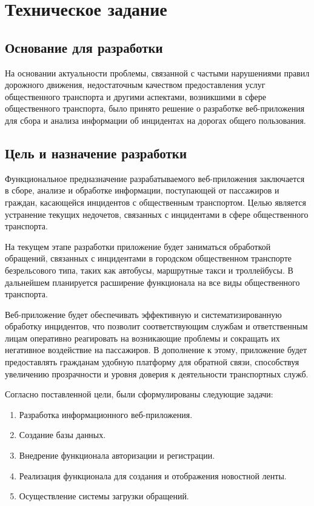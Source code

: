 \section{Техническое задание}
\subsection{Основание для разработки}

На основании актуальности проблемы, связанной с частыми нарушениями правил дорожного движения, недостаточным качеством предоставления услуг общественного транспорта и другими аспектами, возникшими в сфере общественного транспорта, было принято решение о разработке веб-приложения для сбора и анализа информации об инцидентах на дорогах общего пользования.

\subsection{Цель и назначение разработки}

Функциональное предназначение разрабатываемого веб-приложения заключается в сборе, анализе и обработке информации, поступающей от пассажиров и граждан, касающейся инцидентов с общественным транспортом. Целью является устранение текущих недочетов, связанных с инцидентами в сфере общественного транспорта.

На текущем этапе разработки приложение будет заниматься обработкой обращений, связанных с инцидентами в городском общественном транспорте безрельсового типа, таких как автобусы, маршрутные такси и троллейбусы. В дальнейшем планируется расширение функционала на все виды общественного транспорта.

Веб-приложение будет обеспечивать эффективную и систематизированную обработку инцидентов, что позволит соответствующим службам и ответственным лицам оперативно реагировать на возникающие проблемы и сокращать их негативное воздействие на пассажиров. В дополнение к этому, приложение будет предоставлять гражданам удобную платформу для обратной связи, способствуя увеличению прозрачности и уровня доверия к деятельности транспортных служб.


Согласно поставленной цели, были сформулированы следующие задачи:
\begin{enumerate}
\item Разработка информационного веб-приложения.
\item Создание базы данных.
\item Внедрение функционала авторизации и регистрации.
\item Реализация функционала для создания и отображения новостной ленты.
\item Осуществление системы загрузки обращений.
\end{enumerate}

